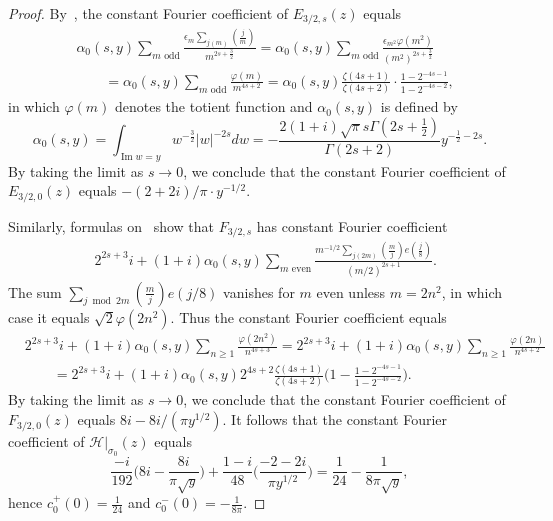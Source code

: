 \documentclass[11pt,reqno]{amsart}
\theoremstyle{plain}
\theoremstyle{definition}
\numberwithin{equation}{section}
\renewcommand{\Im}{\operatorname{Im}}
\begin{document}
\begin{proof}
By~\cite[p.93-94]{HirzebruchZagier76}, the constant Fourier coefficient of $E_{3/2,s}(z)$ equals
\begin{align*}
	& \alpha_0(s,y) \sum_{m \text{ odd}} \frac{\epsilon_m \sum_{j(m)} (\frac{j}{m})}{m^{2s+\frac{3}{2}}} 
	= \alpha_0(s,y) \sum_{m \text{ odd}} \frac{\epsilon_{m^2} \varphi(m^2)}{(m^2)^{2s+\frac{3}{2}}}  \\
	& \qquad = \alpha_0(s,y) \sum_{m \text{ odd}} \frac{\varphi(m)}{m^{4s+2}}
	= \alpha_0(s,y) \frac{\zeta(4s+1)}{\zeta(4s+2)} \cdot \frac{1- 2^{-4s-1}}{1-2^{-4s-2}},
\end{align*}
in which $\varphi(m)$ denotes the totient function and $\alpha_0(s,y)$ is defined by
\[
	\alpha_0(s,y) = \int_{\Im w = y} w^{-\frac{3}{2}} \vert w \vert^{-2s} dw
		= - \frac{2(1+i)\sqrt{\pi} s \Gamma(2s+\frac{1}{2})}{\Gamma(2s+2)} y^{-\frac{1}{2}-2s}.
\]
By taking the limit as $s \to 0$, we conclude that the constant Fourier coefficient of $E_{3/2,0}(z)$ equals $-(2+2i)/\pi \cdot y^{-1/2}$.

Similarly, formulas on~\cite[p.94]{HirzebruchZagier76} show that $F_{3/2,s}$ has constant Fourier coefficient
\begin{align*}
	& 2^{2s+3} i +(1+i)\alpha_0(s,y) \sum_{m \text{ even}}
		\frac{m^{-1/2} \sum_{j(2m)} (\frac{m}{j}) e(\frac{j}{8})}{(m/2)^{2s+1}}.
\end{align*}
The sum $\sum_{j \bmod 2m} (\frac{m}{j})e(j/8)$ vanishes for $m$ even unless $m=2n^2$, in which case it equals $\sqrt{2} \varphi(2n^2)$. Thus the constant Fourier coefficient equals
\begin{align*}
	& 2^{2s+3} i + (1+i)\alpha_0(s,y) \sum_{n \geq 1} \frac{\varphi(2n^2)}{n^{4s+3}}
	= 2^{2s+3} i + (1+i) \alpha_0(s,y) \sum_{n \geq 1} \frac{\varphi(2n)}{n^{4s+2}} \\
	& \qquad
	= 2^{2s+3} i + (1+i) \alpha_0(s,y) 2^{4s+2}
		\frac{\zeta(4s+1)}{\zeta(4s+2)} \Big(1 - \frac{1-2^{-4s-1}}{1-2^{-4s-2}}\Big).
\end{align*}
By taking the limit as $s \to 0$, we conclude that the constant Fourier coefficient of $F_{3/2,0}(z)$ equals $8i -8i/(\pi y^{1/2})$. It follows that the constant Fourier coefficient of $\mathcal{H}\vert_{\sigma_0}(z)$ equals
\[
	\frac{-i}{192} \Big(8i - \frac{8i}{\pi \sqrt{y}}\Big) + \frac{1-i}{48} \Big(\frac{-2-2i}{\pi y^{1/2}}\Big)
	= \frac{1}{24} - \frac{1}{8\pi \sqrt{y}},
\]
hence $c_0^+(0) = \frac{1}{24}$ and $c_0^-(0) = - \frac{1}{8\pi}$. 
\end{proof}

\end{document}
